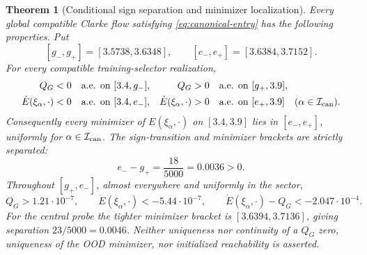 \documentclass[10pt]{article}
\newtheorem{theorem}{Theorem}[section]
\theoremstyle{remark}\newtheorem{remark}[theorem]{Remark}
\begin{document}
\begin{theorem}[Conditional sign separation and minimizer localization]
\label{thm:canonical-full-tube-timing}
Every global compatible Clarke flow satisfying
\eqref{eq:canonical-entry} has the following properties. Put
\[
 [g_-,g_+]=[3.5738,3.6348],\qquad
 [e_-,e_+]=[3.6384,3.7152].
\]
For every compatible training-selector realization,
\begin{align}
 Q_G&<0&&\text{a.e. on }[3.4,g_-],&
 Q_G&>0&&\text{a.e. on }[g_+,3.9],\label{eq:canonical-QG-bracket}\\
 \dot E(\xi_\alpha,\cdot)&<0&&\text{a.e. on }[3.4,e_-],&
 \dot E(\xi_\alpha,\cdot)&>0&&\text{a.e. on }[e_+,3.9]
 \quad(\alpha\in\mathcal I_{\rm can}).
 \label{eq:canonical-E-bracket}
\end{align}
Consequently every minimizer of $E(\xi_\alpha,\cdot)$ on $[3.4,3.9]$
lies in $[e_-,e_+]$, uniformly for $\alpha\in\mathcal I_{\rm can}$.
The sign-transition and minimizer brackets are strictly separated:
\begin{equation}\label{eq:canonical-timing-gap}
 e_- - g_+=\frac{18}{5000}=0.0036>0.
\end{equation}
Throughout $[g_+,e_-]$, almost everywhere and uniformly in the sector,
\begin{equation}\label{eq:canonical-lag-margins}
 Q_G>1.21\cdot10^{-7},\qquad
 \dot E(\xi_\alpha,\cdot)<-5.44\cdot10^{-7},\qquad
 \dot E(\xi_\alpha,\cdot)-Q_G<-2.047\cdot10^{-4}.
\end{equation}
For the central probe the tighter minimizer bracket is
$[3.6394,3.7136]$, giving separation $23/5000=0.0046$.
Neither uniqueness nor continuity of a $Q_G$ zero, uniqueness of the OOD
minimizer, nor initialized reachability is asserted.
\end{theorem}
\end{document}
